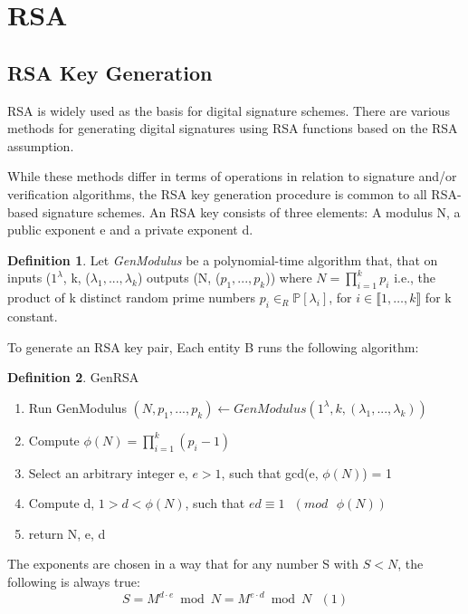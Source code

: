\documentclass[]{final_report}
\theoremstyle{definition}
\newtheorem{definition}{Definition}[chapter]
\begin{document}
\section{RSA}
\subsection{RSA Key Generation}
\label{subSec:keygen}
RSA is widely used as the basis for digital signature schemes. There are various methods for generating digital signatures using RSA functions based on the RSA assumption. 

While these methods differ in terms of operations in relation to signature and/or verification algorithms, the RSA key generation procedure is common to all RSA-based signature schemes.  An RSA key consists of three elements: A modulus N, a public exponent e and a private exponent d.

\begin{definition}
Let \textit{GenModulus} be a polynomial-time algorithm that, that on inputs ($1^\lambda$, k, ($\lambda_{1},...,\lambda_{k}$) outputs (N, ($p_{1},...,p_{k}$)) where $N = \displaystyle\prod_{i=1}^{k} p_{i}$ i.e., the product of k distinct random prime numbers $p_i \in_{R} \mathbb{P}[\lambda_i]$, for $i \in \llbracket1, \ldots, k \rrbracket$ for k constant. 
\end{definition}

To generate an RSA key pair, Each entity B runs the following algorithm:

\begin{definition} GenRSA
\label{def:GenRSA}
\begin{mdframed}
\begin{enumerate}
    \item Run GenModulus $(N, p_{1},...,p_{k}) \leftarrow GenModulus(1^\lambda, k, (\lambda_{1},...,\lambda_{k}))$
    \item Compute $\phi(N) = \displaystyle\prod_{i=1}^{k} (p_i - 1)$
    \item Select an arbitrary integer e, $e > 1$, such that gcd(e, $\phi(N)$) = 1 
    \item Compute d, $1 > d < \phi(N)$, such that $ed \equiv 1 \text{ } (mod \text{ } \phi(N))$
    \item return N, e, d
\end{enumerate}
\end{mdframed}
\end{definition}

The exponents are chosen in a way that for any number S with $S < N$, the following is always true:
\[S = M^{d \cdot e} \bmod N = M^{e \cdot d} \bmod N \text{ } (1)\]
\end{document}
